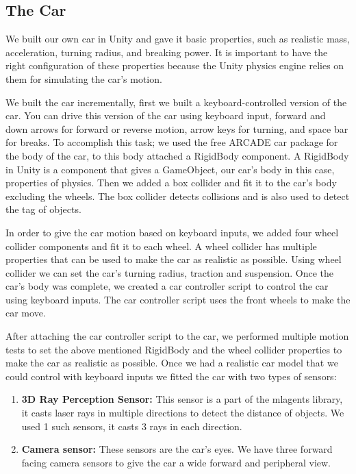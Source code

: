 \documentclass[conference]{IEEEtran}
\begin{document}
\subsection{The Car}
We built our own car in Unity and gave it basic properties, such as realistic mass, acceleration, turning radius, and breaking power. It is important to have the right configuration of these properties because the Unity physics engine relies on them for simulating the car's motion. 
\par
We built the car incrementally, first we built a keyboard-controlled version of the car. You can drive this version of the car using keyboard input, forward and down arrows for forward or reverse motion, arrow keys for turning, and space bar for breaks. To accomplish this task; we used the free ARCADE car package for the body of the car, to this body attached a RigidBody component. A RigidBody in Unity is a component that gives a GameObject, our car's body in this case, properties of physics. Then we added a box collider and fit it to the car's body excluding the wheels. The box collider detects collisions and is also used to detect the tag of objects.
\par

In order to give the car motion based on keyboard inputs, we added four wheel collider components and fit it to each wheel. A wheel collider has multiple properties that can be used to make the car as realistic as possible. Using wheel collider we can set the car's turning radius, traction and suspension.
Once the car's body was complete, we created a car controller script to control the car using keyboard inputs. The car controller script uses the front wheels to make the car move. 
\par

After attaching the car controller script to the car, we performed multiple motion tests to set the above mentioned RigidBody and the wheel collider properties to make the car as realistic as possible. Once we had a realistic car model that we could control with keyboard inputs we fitted the car with two types of sensors:
\begin{enumerate}
    \item \textbf{3D Ray Perception Sensor:} This sensor is a part of the mlagents library, it casts laser rays in multiple directions to detect the distance of objects. We used 1 such sensors, it casts 3 rays in each direction.
    \item \textbf{Camera sensor:} These sensors are the car's eyes. We have three forward facing camera sensors to give the car a wide forward and peripheral view.
\end{enumerate}
\end{document}
